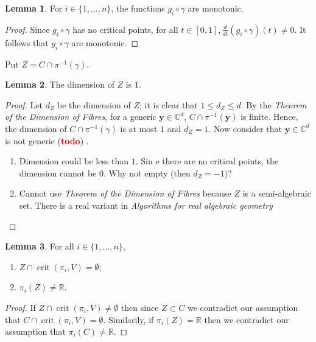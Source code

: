 \documentclass[10pt]{article}
\theoremstyle{definition}
\newtheorem{lemma}{Lemma}
\newcommand{\C}{\mathbb{C}}
\newcommand{\R}{\mathbb{R}}
\def\td{(\textcolor{red}{{\bf todo}})}
\def\td{(\textcolor{red}{{\bf todo}}) }
\DeclareMathOperator{\crit}{crit}
\begin{document}
%
%
\begin{lemma}
For $i \in \{1,\hdots,n\}$, the functions $g_i \circ \gamma$ are monotonic. 
\end{lemma}
%
%
\begin{proof}
Since $g_i \circ \gamma$ has no critical points, for all $t \in [0,1], \frac{d}{dt}\left(g_i \circ \gamma\right)(t)\not =0.$ It follows that $g_i \circ \gamma$ are monotonic. 
\end{proof}
%
\noindent 
Put $Z = C \cap \pi^{-1}(\gamma).$ 
%
\begin{lemma}
The dimension of $Z$ is $1$. 
\end{lemma}
%
%
\begin{proof}
Let $d_Z$ be the dimension of $Z$; it is clear that $1 \leq d_Z \leq d$. By the 
\textit{Theorem of the Dimension of Fibres}\cite{Shafarevich}, for a generic $\bm y \in \C^d$, $C \cap \pi^{-1}(\bm y)$ is finite. Hence, the dimension of $C \cap \pi^{-1}(\gamma)$ is at most $1$ and $d_Z=1$. Now consider that $\bm y \in \C^d$ is not generic \td.


\begin{enumerate}
    \item Dimension could be less than $1$. Sin e there are no critical points, the dimension cannot be $0$. Why not empty (then $d_Z = -1$)?
    \item Cannot use \textit{Theorem of the Dimension of Fibres} because $Z$ is a semi-algebraic set. There is a real variant in \textit{Algorithms for real algebraic geometry} 
\end{enumerate}


\end{proof}
%
%
\begin{lemma}\label{lemma:DimensionOneAssumptionsHold}
For all $i \in \{1,\hdots,n\}$, 
\begin{enumerate}
    \item $Z \cap \crit(\pi_i,V) = \emptyset$;
    \item $\pi_i(Z) \not = \R$.
\end{enumerate}
\end{lemma}
%
%
\begin{proof}
If $Z \cap \crit(\pi_i,V) \not = \emptyset$ then since $Z \subset C$ we contradict our assumption that $C \cap \crit(\pi_i,V) = \emptyset$. Similarily, if $\pi_i(Z) = \R$ then we contradict our assumption that $\pi_i(C) \not = \R.$  
\end{proof}
%
\end{document}
